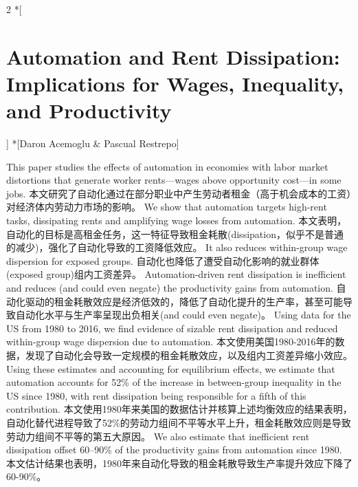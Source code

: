 \documentclass[cn,hazy,blue,14pt,screen]{elegantnote}
\begin{document}
\begin{paracol}{2}
	\switchcolumn[0]*[\section{Automation and Rent Dissipation: Implications for Wages, Inequality, and Productivity}]
	\switchcolumn[0]*[Daron Acemoglu \& Pascual Restrepo]
	\switchcolumn
	
	\switchcolumn*
	This paper studies the effects of automation in economies with labor market distortions that generate worker rents—wages above opportunity cost—in some jobs. 
	\switchcolumn
	本文研究了自动化通过在部分职业中产生劳动者租金（高于机会成本的工资）对经济体内劳动力市场的影响。
	\switchcolumn*
	We show that automation targets high-rent tasks, dissipating rents and amplifying wage losses from automation. 
	\switchcolumn
	本文表明，自动化的目标是高租金任务，这一特征导致租金耗散(dissipation，似乎不是普通的减少)，强化了自动化导致的工资降低效应。
	\switchcolumn*
	It also reduces within-group wage dispersion for exposed groups. 
	\switchcolumn
	自动化也降低了遭受自动化影响的就业群体(exposed group)组内工资差异。
	\switchcolumn*
	Automation-driven rent dissipation is inefficient and reduces (and could even negate) the productivity gains from automation. 
	\switchcolumn
	自动化驱动的租金耗散效应是经济低效的，降低了自动化提升的生产率，甚至可能导致自动化水平与生产率呈现出负相关(and could even negate)。
	\switchcolumn*
	Using data for the US from 1980 to 2016, we find evidence of sizable rent dissipation and reduced within-group wage dispersion due to automation. 
	\switchcolumn
	本文使用美国1980-2016年的数据，发现了自动化会导致一定规模的租金耗散效应，以及组内工资差异缩小效应。
	\switchcolumn*
	Using these estimates and accounting for equilibrium effects, we estimate that automation accounts for 52\% of the increase in between-group inequality in the US since 1980, with rent dissipation being responsible for a fifth of this contribution. 
	\switchcolumn
	本文使用1980年来美国的数据估计并核算上述均衡效应的结果表明，自动化替代进程导致了52\%的劳动力组间不平等水平上升，租金耗散效应则是导致劳动力组间不平等的第五大原因。
	\switchcolumn*
	We also estimate that inefficient rent dissipation offset 60–90\% of the productivity gains from automation since 1980.
	\switchcolumn
	本文估计结果也表明，1980年来自动化导致的租金耗散导致生产率提升效应下降了60-90\%。
\end{paracol}
\end{document}
